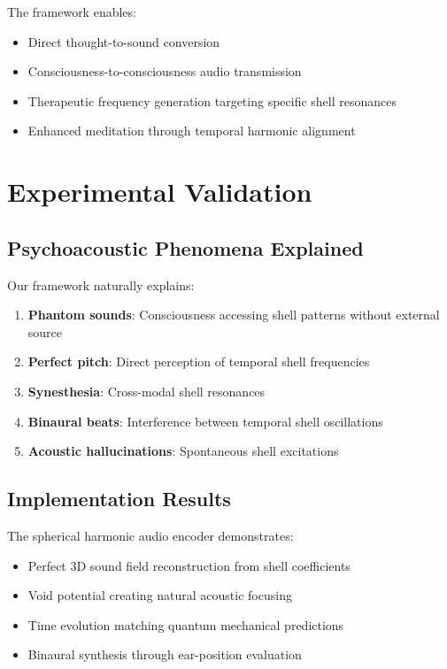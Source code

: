 \documentclass[12pt]{article}
\begin{document}
The framework enables:
\begin{itemize}
\item Direct thought-to-sound conversion
\item Consciousness-to-consciousness audio transmission
\item Therapeutic frequency generation targeting specific shell resonances
\item Enhanced meditation through temporal harmonic alignment
\end{itemize}

\section{Experimental Validation}

\subsection{Psychoacoustic Phenomena Explained}

Our framework naturally explains:
\begin{enumerate}
\item \textbf{Phantom sounds}: Consciousness accessing shell patterns without external source
\item \textbf{Perfect pitch}: Direct perception of temporal shell frequencies
\item \textbf{Synesthesia}: Cross-modal shell resonances
\item \textbf{Binaural beats}: Interference between temporal shell oscillations
\item \textbf{Acoustic hallucinations}: Spontaneous shell excitations
\end{enumerate}

\subsection{Implementation Results}

The spherical harmonic audio encoder demonstrates:
\begin{itemize}
\item Perfect 3D sound field reconstruction from shell coefficients
\item Void potential creating natural acoustic focusing
\item Time evolution matching quantum mechanical predictions
\item Binaural synthesis through ear-position evaluation
\end{itemize}
\end{document}
